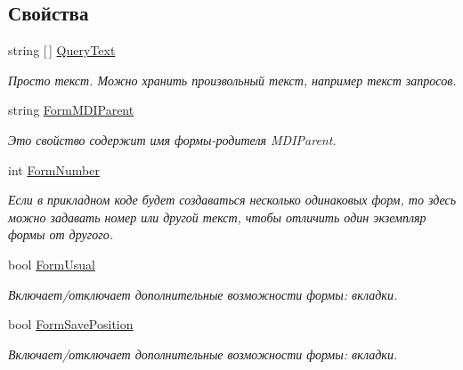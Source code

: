 \subsection*{Свойства}
\begin{DoxyCompactItemize}
\item 
string \mbox{[}$\,$\mbox{]} \mbox{\hyperlink{class_f_b_a_1_1_form_obj_a84c3e545a6cc2d3c5332635d218f20b8}{Query\+Text}}
\begin{DoxyCompactList}\small\item\em Просто текст. Можно хранить произвольный текст, например текст запросов. \end{DoxyCompactList}\item 
string \mbox{\hyperlink{class_f_b_a_1_1_form_obj_aa66d3c49abb40d19f4a5d989e583c864}{Form\+M\+D\+I\+Parent}}
\begin{DoxyCompactList}\small\item\em Это свойство содержит имя формы-\/родителя M\+D\+I\+Parent. \end{DoxyCompactList}\item 
int \mbox{\hyperlink{class_f_b_a_1_1_form_obj_a0925f190c3b1fded776c7da00811f5ea}{Form\+Number}}
\begin{DoxyCompactList}\small\item\em Если в прикладном коде будет создаваться несколько одинаковых форм, то здесь можно задавать номер или другой текст, чтобы отличить один экземпляр формы от другого. \end{DoxyCompactList}\item 
bool \mbox{\hyperlink{class_f_b_a_1_1_form_obj_af413b06fa4ced1f86f62d660b78071fb}{Form\+Usual}}
\begin{DoxyCompactList}\small\item\em Включает/отключает дополнительные возможности формы\+: вкладки. \end{DoxyCompactList}\item 
bool \mbox{\hyperlink{class_f_b_a_1_1_form_obj_aee28e366247372fbac9d3c1a0df330c1}{Form\+Save\+Position}}
\begin{DoxyCompactList}\small\item\em Включает/отключает дополнительные возможности формы\+: вкладки. \end{DoxyCompactList}\end{DoxyCompactItemize}



